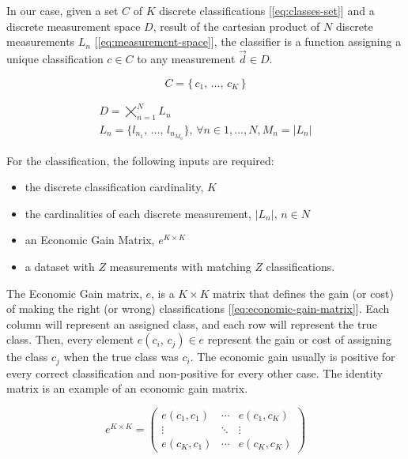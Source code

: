 \documentclass[letterpaper, conference]{IEEEtran}
\begin{document}
In our case, given a set $C$ of $K$ discrete classifications [\ref{eq:classes-set}] and a discrete measurement space $D$, result of the cartesian product of $N$ discrete measurements $L_n$ [\ref{eq:measurement-space}], the classifier is a function assigning a unique classification $c \in C$ to any measurement $\vec{d} \in D$.

\begin{equation}\label{eq:classes-set}
C = \{\,c_1,\, \dots,\, c_{K}\,\}
\end{equation}


\begin{gather}\label{eq:measurement-space}
D = \bigtimes_{n=1}^{N} L_n \\
L_n = \{l_{n_1},\, \dots,\, l_{n_{M_n}}\},\, \forall n \in { 1, ..., N }, M_n = \vert L_n\vert
\end{gather}

For the classification, the following inputs are required:

\begin{itemize}
  \item the discrete classification cardinality, $K$
  \item the cardinalities of each discrete measurement, $\vert L_n \vert,\, n \in N$
  \item an Economic Gain Matrix, $e^{K \times K}$
  \item a dataset with $Z$ measurements with matching $Z$ classifications. 
\end{itemize}

The Economic Gain matrix, $e$, is a $K \times K$ matrix that defines the gain (or cost) of making the right (or wrong) classifications [\ref{eq:economic-gain-matrix}]. Each column will represent an assigned class, and each row will represent the true class. Then, every element $e(c_i,\, c_j) \in e$ represent the gain or cost of assigning the class $c_j$ when the true class was $c_i$. The economic gain usually is positive for every correct classification and non-positive for every other case. The identity matrix is an example of an economic gain matrix.

\begin{equation}\label{eq:economic-gain-matrix}
  e^{K \times K} = \begin{pmatrix}
    e(c_1,c_1) & \cdots & e(c_1,c_K) \\
      \vdots   & \ddots &    \vdots   \\
    e(c_K,c_1) & \cdots & e(c_K,c_K)
  \end{pmatrix}
\end{equation}
\end{document}
